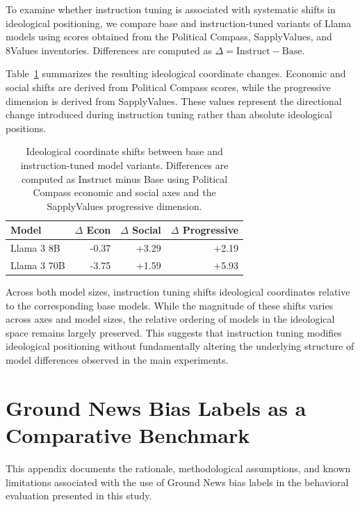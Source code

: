 \documentclass[11pt]{article}
\begin{document}
To examine whether instruction tuning is associated with systematic shifts in
ideological positioning, we compare base and instruction-tuned variants of
Llama models using scores obtained from the Political Compass, SapplyValues,
and 8Values inventories. Differences are computed as
$\Delta = \text{Instruct} - \text{Base}$.

Table~\ref{tab:base_instruct_shift} summarizes the resulting ideological
coordinate changes. Economic and social shifts are derived from Political
Compass scores, while the progressive dimension is derived from SapplyValues.
These values represent the directional change introduced during instruction
tuning rather than absolute ideological positions.

\begin{table}[t]
\centering
\small
\setlength{\tabcolsep}{6pt}
\begin{tabular}{l r r r}
\toprule
\textbf{Model} & $\Delta$ Econ & $\Delta$ Social & $\Delta$ Progressive \\
\midrule
Llama 3 8B & -0.37 & +3.29 & +2.19 \\
Llama 3 70B & -3.75 & +1.59 & +5.93 \\
\bottomrule
\end{tabular}
\caption{Ideological coordinate shifts between base and instruction-tuned
model variants. Differences are computed as Instruct minus Base using
Political Compass economic and social axes and the SapplyValues progressive
dimension.}
\label{tab:base_instruct_shift}
\end{table}

Across both model sizes, instruction tuning shifts ideological coordinates
relative to the corresponding base models. While the magnitude of these shifts
varies across axes and model sizes, the relative ordering of models in the
ideological space remains largely preserved. This suggests that instruction
tuning modifies ideological positioning without fundamentally altering the
underlying structure of model differences observed in the main experiments.






\section{Ground News Bias Labels as a Comparative Benchmark}
\label{sec:appendix-groundnews}

This appendix documents the rationale, methodological assumptions, and known
limitations associated with the use of Ground News bias labels in the behavioral
evaluation presented in this study.
\end{document}
